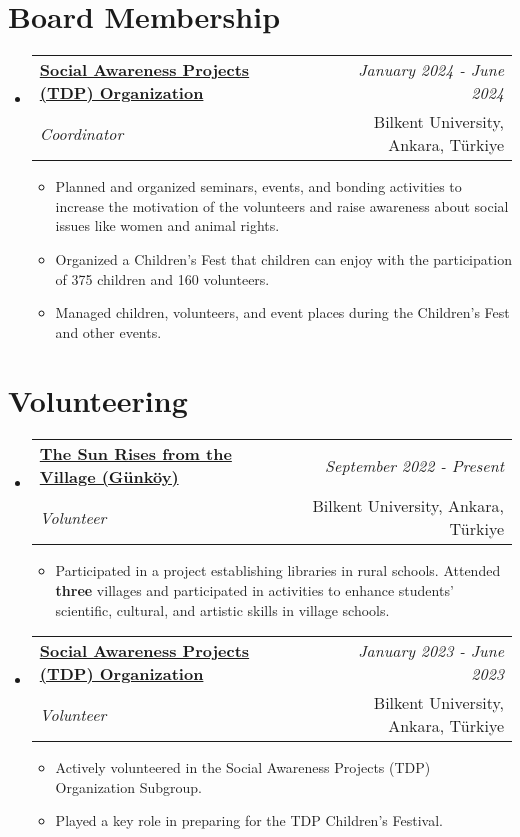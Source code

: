 \documentclass[a4paper,11pt]{article}
\makeatletter
\newcommand{\resumeSubheading}[4]{
\vspace{0.5mm}\item
    \begin{tabular*}{0.98\textwidth}[t]{l@{\extracolsep{\fill}}r}
    \textbf{#1} & \textit{\footnotesize{#4}} \\
    \textit{\footnotesize{#3}} &  \footnotesize{#2} \\
    \end{tabular*}\vspace{-2.4mm}
}
\newcommand{\resumeSubHeadingListStart}{\begin{itemize}[leftmargin=*,labelsep=0mm]}
\newcommand{\resumeItemListStart}{\begin{justify}\begin{itemize}[leftmargin=3ex, rightmargin=2ex, noitemsep,labelsep=1.2mm,itemsep=0mm]\small}
\newcommand{\resumeSubHeadingListEnd}{\end{itemize}\vspace{2mm}}
\newcommand{\resumeItemListEnd}{\end{itemize}\end{justify}\vspace{-2mm}}
\makeatother
\begin{document}

\section{\textbf{Board Membership}}
    \resumeSubHeadingListStart
        \resumeSubheading
            {\href{https://w3.bilkent.edu.tr/www/ogrenci-dekanligi/toplumsal-duyarlilik-projeleri/}{Social Awareness Projects (TDP) Organization}}{Bilkent University, Ankara, Türkiye}
            {Coordinator}{January 2024 - June 2024}
                \resumeItemListStart
                    \item Planned and organized seminars, events, and bonding activities to increase the motivation of the volunteers and raise awareness about social issues like women and animal rights.
                    \item Organized a Children’s Fest that children can enjoy with the participation of 375 children and 160 volunteers.
                    \item Managed children, volunteers, and event places during the Children’s Fest and other events.
                \resumeItemListEnd
    \resumeSubHeadingListEnd
\vspace{-6.5mm}


\section{\textbf{Volunteering}}
    \resumeSubHeadingListStart
        \resumeSubheading
            {\href{https://w3.bilkent.edu.tr/www/ogrenci-dekanligi/toplumsal-duyarlilik-projeleri/}{The Sun Rises from the Village (Günköy)}}{Bilkent University, Ankara, Türkiye}
            {Volunteer}{September 2022 - Present}
                \resumeItemListStart
                    \item Participated in a project establishing libraries in rural schools. Attended {\textbf{three}} villages and participated in activities to enhance students' scientific, cultural, and artistic skills in village schools.
                \resumeItemListEnd
        \resumeSubheading
            {\href{https://w3.bilkent.edu.tr/www/ogrenci-dekanligi/toplumsal-duyarlilik-projeleri/}{Social Awareness Projects (TDP) Organization}}{Bilkent University, Ankara, Türkiye}
            {Volunteer}{January 2023 - June 2023}
                \resumeItemListStart
                    \item Actively volunteered in the Social Awareness Projects (TDP) Organization Subgroup.
                    \item Played a key role in preparing for the TDP Children’s Festival.
                \resumeItemListEnd
    \resumeSubHeadingListEnd
\vspace{-6.5mm}
\end{document}
